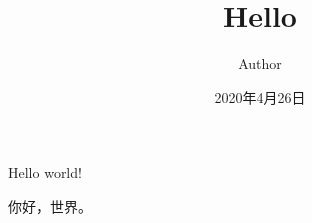 \documentclass{article}
\title{Hello}
\author{Author}
\date{2020年4月26日}
\begin{document}
    \maketitle
    Hello world!
    
    你好，世界。
\end{document}
